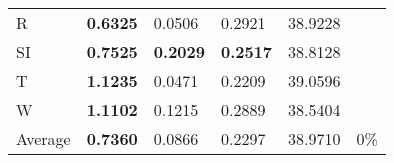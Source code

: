 \documentclass[11pt, a4paper]{article}
\begin{document}
\begin{table}[H]
\begin{tabular}{llllll}
R                                & \textbf{0.6325}                   & 0.0506                            & 0.2921                               & 38.9228                                     &                                   \\
SI                        & \textbf{0.7525}                   & \textbf{0.2029}                   & \textbf{0.2517}                      & 38.8128                                     &                                   \\
T                              & \textbf{1.1235}                   & 0.0471                            & 0.2209                               & 39.0596                                     &                                   \\
W                             & \textbf{1.1102}                   & 0.1215                            & 0.2889                               & 38.5404                                     &                                   \\ \hline
Average                               & \textbf{0.7360}                   & 0.0866                            & 0.2297                               & 38.9710                                     & 0\%
\end{tabular}
\end{table}
\end{document}
